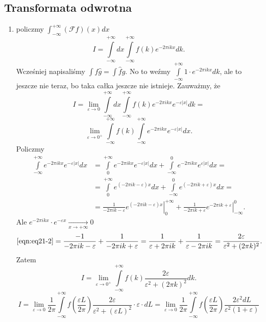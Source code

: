 \documentclass[../main.tex]{subfiles}
\begin{document}
\subsection{Transformata odwrotna}
\begin{enumerate}
    \item policzmy $\int_{-\infty}^{+\infty}\left( \mathcal{F}f \right) (x)dx$
        \[
            I = \int\limits_{-\infty}^{+\infty}dx\int\limits_{-\infty}^{+\infty}f(k)e^{-2\pi i k x}dk
        .\]
    Wcześniej napisaliśmy $\int f \hat{g} = \int \hat{f} g$. No to weźmy $\int\limits_{-\infty}^{+\infty} 1 \cdot e^{-2\pi i kx}dk$, ale to jeszcze nie teraz, bo taka całka jeszcze nie istnieje. Zauważmy, że
        \[
            I = \lim_{\varepsilon \to 0}\int\limits_{-\infty}^{+\infty}dx \int\limits_{-\infty}^{+\infty}f(k)e^{-2\pi i k x}e^{-\varepsilon|x|}dk =
        \]
    \[
        \lim_{\varepsilon \to 0^+} \int\limits_{-\infty}^{+\infty}f(k)\int\limits_{-\infty}^{+\infty}e^{-2\pi i kx}e^{-\varepsilon|x|}dx
    .\]
Policzmy
\begin{align*}
    \int\limits_{-\infty}^{+\infty}e^{-2\pi i kx}e^{-\varepsilon|x|}dx &= \int\limits_{0}^{+\infty}e^{-2\pi i kx}e^{-\varepsilon|x|}dx + \int\limits_{-\infty}^{0}e^{-2\pi i kx}e^{\varepsilon|x|}dx =\\
    &=
    \label{eqn:eq21-2}
    \int\limits_{0}^{+\infty}e^{(-2\pi i k - \varepsilon)x}dx + \int\limits_{-\infty}^{0}e^{(-2\pi ik + \varepsilon)x}dx =\\
    &= \frac{1}{-2\pi i k -\varepsilon}\left.e^{(-2\pi i k - \varepsilon)x}\right|_{0}^{+\infty} + \frac{1}{-2\pi i k + \varepsilon}\left.e^{-2\pi ik + \varepsilon}\right|_{-\infty}^0 \tag{$\star\star$}
.\end{align*}
Ale $e^{-2\pi i kx} \cdot e^{-\varepsilon x}\underset{x\to +\infty}{\longrightarrow} 0$
\[
    \eqref{eqn:eq21-2} = \frac{-1}{-2\pi i k - \varepsilon} + \frac{1}{-2 \pi i k + \varepsilon} = \frac{1}{\varepsilon + 2 \pi i k} + \frac{1}{\varepsilon - 2\pi i k} = \frac{2 \varepsilon}{\varepsilon^2 + (2\pi k)^2}
.\]
Zatem
\[
    I = \lim_{\varepsilon \to 0^+} \int\limits_{-\infty}^{+\infty}f(k) \frac{2\varepsilon}{\varepsilon^2 + (2\pi k)^2}dk
.\]
\[
    I = \lim_{\varepsilon \to 0} \frac{1}{2\pi}\int\limits_{-\infty}^{+\infty}f\left( \frac{\varepsilon L}{2\pi} \right) \frac{2 \varepsilon}{\varepsilon^2 + (\varepsilon L)^2} \cdot \varepsilon \cdot dL = \lim_{\varepsilon \to 0}\frac{1}{2\pi}\int\limits_{-\infty}^{+\infty}f\left( \frac{\varepsilon L}{2\pi} \right) \frac{2 \varepsilon^2 dL}{\varepsilon^2(1+\varepsilon)}
\]
\end{enumerate}
\end{document}

